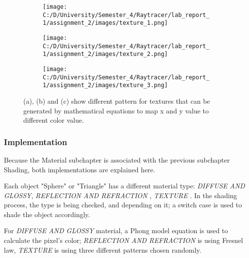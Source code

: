 \documentclass{article}
\begin{document}
	
	\begin{figure}[ht]
		\begin{center}
			\begin{subfigure}{.3\textwidth}
				\centering
				\texttt{[image: C:/D/University/Semester\_4/Raytracer/lab\_report\_1/assignment\_2/images/texture\_1.png]}  
				\caption{}
				\label{fig:sub-first}
			\end{subfigure}
			\begin{subfigure}{.3\textwidth}
				\centering
				\texttt{[image: C:/D/University/Semester\_4/Raytracer/lab\_report\_1/assignment\_2/images/texture\_2.png]}  
				\caption{}
				\label{fig:sub-second}
			\end{subfigure}
			\begin{subfigure}{.3\textwidth}
				\centering
				\texttt{[image: C:/D/University/Semester\_4/Raytracer/lab\_report\_1/assignment\_2/images/texture\_3.png]}  
				\caption{}
				\label{fig:sub-third}
			\end{subfigure}
			
			\caption{(a), (b) and (c) show different pattern for textures that can be generated by mathematical equations to map x and y value to different color value.}
			\label{fig:8}
		\end{center}
	\end{figure}
	
	
	\subsubsection{Implementation}
	Because the Material subchapter is associated with the previous subchapter Shading, both implementations are explained here. 
	
	Each object "Sphere" or "Triangle" has a different material type: \textit{DIFFUSE AND GLOSSY}, \textit{REFLECTION AND REFRACTION }, \textit{TEXTURE }.
	In the shading process, the type is being checked, and depending on it; a switch case is used to shade the object accordingly. 
	
	For \textit{DIFFUSE AND GLOSSY }material, a Phong model equation is used to calculate the pixel's color; \textit{REFLECTION AND REFRACTION} is using Fresnel law, \textit{TEXTURE } is using three different patterns chosen randomly.
		
\end{document}
